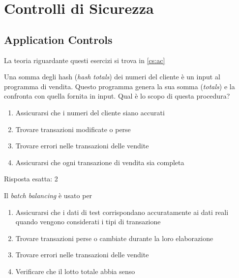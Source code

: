 \section{Controlli di Sicurezza}
\label{esCs}

\subsection{Application Controls}
\label{esCs:ac}

La teoria riguardante questi esercizi si trova in \ref{cs:ac}


\begin{Exercise} [
  title={Quiz},
  label={esCs1}
  ]

  \Question Una somma degli hash (\textit{hash totals}) dei numeri del 
cliente è un input al programma di vendita. Questo programma genera la
sua somma (\textit{totals}) e la confronta con quella fornita in input.
Qual è lo scopo di questa procedura?
\begin{enumerate}
 \item Assicurarsi che i numeri del cliente siano accurati
 \item Trovare transazioni modificate o perse
 \item Trovare errori nelle transazioni delle vendite
 \item Assicurarsi che ogni transazione di vendita sia completa
\end{enumerate}

\end{Exercise}

\begin{Answer} [
  ref={esCs1},
  number={1}
  ]

  \Question Risposta esatta: 2
\end{Answer}


\begin{Exercise} [
  title={Quiz},
  label={esCs2}
  ]

  \Question Il \textit{batch balancing} \`e usato per
  \begin{enumerate}
   \item Assicurarsi che i dati di test corrispondano accuratamente ai dati
reali quando vengono considerati i tipi di transazione
   \item Trovare transazioni perse o cambiate durante la loro elaborazione
   \item Trovare errori nelle transazioni delle vendite
   \item Verificare che il lotto totale abbia senso
  \end{enumerate}
\end{Exercise}

